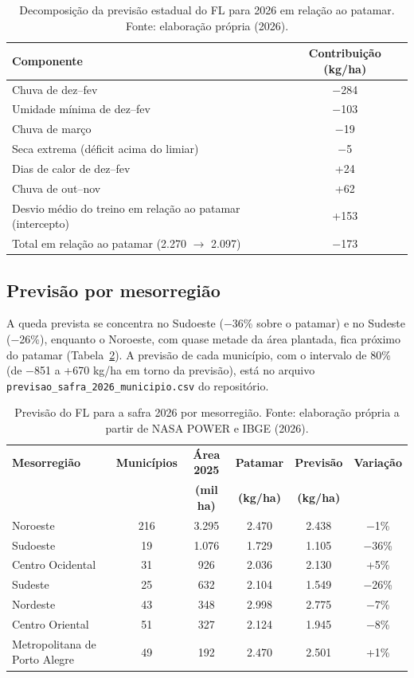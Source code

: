 \documentclass[12pt]{article}
\begin{document}
\begin{table}[ht]
\centering
\caption{Decomposição da previsão estadual do FL para 2026 em relação ao
  patamar. Fonte: elaboração própria (2026).}
\label{tab:decomposicao}
\begin{tabular}{|p{9.0cm}|c|}
\hline
\textbf{Componente} & \textbf{Contribuição (kg/ha)} \\ \hline
Chuva de dez--fev & $-$284 \\ \hline
Umidade mínima de dez--fev & $-$103 \\ \hline
Chuva de março & $-$19 \\ \hline
Seca extrema (déficit acima do limiar) & $-$5 \\ \hline
Dias de calor de dez--fev & +24 \\ \hline
Chuva de out--nov & +62 \\ \hline
Desvio médio do treino em relação ao patamar (intercepto) & +153 \\ \hline
Total em relação ao patamar (2.270 $\rightarrow$ 2.097) & $-$173 \\ \hline
\end{tabular}
\end{table}

\subsection{Previsão por mesorregião}

A queda prevista se concentra no Sudoeste ($-$36\% sobre o patamar) e no
Sudeste ($-$26\%), enquanto o Noroeste, com quase metade da área
plantada, fica próximo do patamar (Tabela~\ref{tab:meso2026}). A previsão
de cada município, com o intervalo de 80\% (de $-$851 a +670 kg/ha em
torno da previsão), está no arquivo
\texttt{previsao\_safra\_2026\_municipio.csv} do repositório.

\begin{table}[ht]
\centering
\caption{Previsão do FL para a safra 2026 por mesorregião. Fonte:
  elaboração própria a partir de NASA POWER e IBGE (2026).}
\label{tab:meso2026}
\small
\begin{tabular}{|p{3.6cm}|c|c|c|c|c|}
\hline
\textbf{Mesorregião} & \textbf{Municípios} & \textbf{Área 2025} &
  \textbf{Patamar} & \textbf{Previsão} & \textbf{Variação} \\
 & & \textbf{(mil ha)} & \textbf{(kg/ha)} & \textbf{(kg/ha)} & \\ \hline
Noroeste & 216 & 3.295 & 2.470 & 2.438 & $-$1\% \\ \hline
Sudoeste & 19 & 1.076 & 1.729 & 1.105 & $-$36\% \\ \hline
Centro Ocidental & 31 & 926 & 2.036 & 2.130 & +5\% \\ \hline
Sudeste & 25 & 632 & 2.104 & 1.549 & $-$26\% \\ \hline
Nordeste & 43 & 348 & 2.998 & 2.775 & $-$7\% \\ \hline
Centro Oriental & 51 & 327 & 2.124 & 1.945 & $-$8\% \\ \hline
Metropolitana de Porto Alegre & 49 & 192 & 2.470 & 2.501 & +1\% \\ \hline
\end{tabular}
\end{table}
\end{document}
